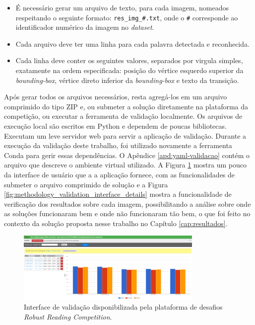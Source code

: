 \begin{itemize}
    \item É necessário gerar um arquivo de texto, para cada imagem, nomeados respeitando o seguinte formato: \texttt{res\_img\_\#.txt}, onde o \texttt{\#} corresponde ao identificador numérico da imagem no \textit{dataset}.
    \item Cada arquivo deve ter uma linha para cada palavra detectada e reconhecida.
    \item Cada linha deve conter os seguintes valores, separados por virgula simples, exatamente na ordem especificada: posição do vértice esquerdo superior da \textit{bounding-box}, vértice direto inferior da \textit{bounding-box} e texto da transição.
\end{itemize}

Após gerar todos os arquivos necessários, resta agregá-los em um arquivo comprimido do tipo ZIP e, ou submeter a solução diretamente na plataforma da competição, ou executar a ferramenta de validação localmente. Os arquivos de execução local são escritos em Python e dependem de poucas bibliotecas. Executam um leve servidor web para servir a aplicação de validação. Durante a execução da validação deste trabalho, foi utilizado novamente a ferramenta Conda para gerir essas dependências. O Apêndice \ref{apd:yaml-validacao} contém o arquivo que descreve o ambiente virtual utilizado. A Figura \ref{fig:methodology_validation_interface} mostra um pouco da interface de usuário que a a aplicação fornece, com as funcionalidades de submeter o arquivo comprimido de solução e a Figura \ref{fig:methodology_validation_interface_details} mostra a funcionalidade de verificação dos resultados sobre cada imagem, possibilitando a análise sobre onde as soluções funcionaram bem e onde não funcionaram tão bem, o que foi feito no contexto da solução proposta nesse trabalho no Capítulo \ref{cap:resultados}.

\begin{figure}
    \centering
    \includegraphics[width=0.8\textwidth]{figs/metodologia-interface-validacao.png}
    \caption{Interface de validação disponibilizada pela plataforma de desafios \textit{Robust Reading Competition}.}
    \label{fig:methodology_validation_interface}
\end{figure}

